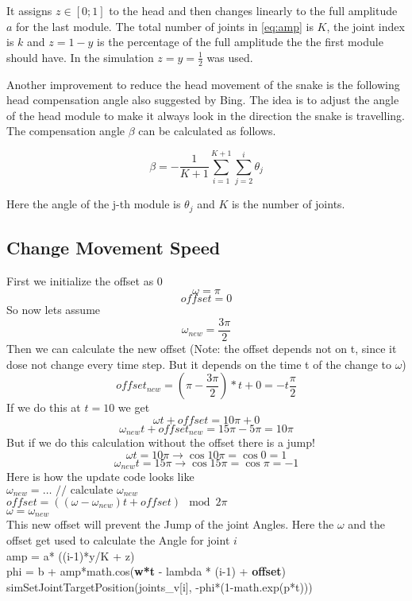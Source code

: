 It assigns $z \in \left[0; 1\right]$ to the head and then changes linearly to the full amplitude $ a$ for the last module. The total number of joints in \ref{eq:amp} is $ K $, the joint index is $k$ and $z = 1 - y$ is the percentage of the full amplitude the the first module should have. In the simulation $ z = y = \frac{1}{2} $ was used.

Another improvement to reduce the head movement of the snake is the following head compensation angle also suggested by Bing\cite{Bing}. The idea is to adjust the angle of the head module to make it always look in the direction the snake is travelling. The compensation angle $ \beta $ can be calculated as follows.

\begin{equation}\label{eq:comp}
\beta = - \frac{1}{K + 1}\sum_{i = 1}^{K + 1}\sum_{j = 2}^{i} \theta_j
\end{equation}

Here the angle of the j-th module is $ \theta_j $ and $K$ is the number of joints.


\subsection{Change Movement Speed}


First we initialize the offset as 0
\[ \omega = \pi \]
\[ offset = 0 \]
So now lets assume
\[ \omega_{new} = \frac{3\pi}{2} \]
Then we can calculate the new offset (Note: the offset depends not on t, since it dose not change every time step. But it depends on the time t of the change to $\omega$)
\[ offset_{new} = (\pi - \frac{3\pi}{2}) * t + 0 = -t\frac{\pi}{2} \]
If we do this at $t = 10$ we get
\[ \omega t + offset = 10\pi + 0 \]
\[ \omega_{new}t + offset_{new} = 15\pi - 5\pi = 10\pi \]
But if we do this calculation without the offset there is a jump!
\[ \omega t = 10\pi \rightarrow \cos10\pi = \cos0 = 1 \]
\[ \omega_{new}t = 15\pi \rightarrow \cos15\pi = \cos\pi = -1 \]
Here is how the update code looks like\\
$ \omega_{new} = \dots \text{ // calculate } \omega_{new} $\\
$ offset = ((\omega - \omega_{new}) t + offset) \mod 2\pi $\\
$\omega = \omega_{new}$ \\
This new offset will prevent the Jump of the joint Angles.
Here the $\omega$ and the offset get used to calculate the Angle for joint $i$\\
amp = a* ((i-1)*y/K + z)\\
phi = b + amp*math.cos(\textbf{w*t} - lambda * (i-1) + \textbf{offset})\\
simSetJointTargetPosition(joints\_v[i], -phi*(1-math.exp(p*t)))\\

